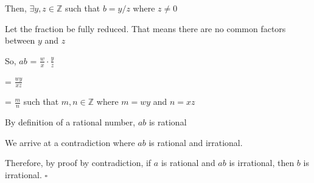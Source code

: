 \documentclass{article} %
\begin{document}
    Then, $\exists y, z \in \mathbb{Z}$ such that $b = y/z$ where $z \neq 0$

    Let the fraction be fully reduced. That means there are no common factors between $y$ and $z$

    So, $ab$ = $\frac{w}{x} \cdot \frac{y}{z}$ 
    
    \vspace*{0.1cm}

    \tabto*{1.55cm} = $\frac{wy}{xz}$

    \vspace*{0.1cm}

    \tabto*{1.55cm} = $\frac{m}{n}$ such that $m, n \in \mathbb{Z}$ where $m = wy$ and $n = xz$

    By definition of a rational number, $ab$ is rational

    We arrive at a contradiction where $ab$ is rational and irrational.

    Therefore, by proof by contradiction, if $a$ is rational and $ab$ is irrational, then $b$ is irrational. $\square$


    





    
\end{document}
